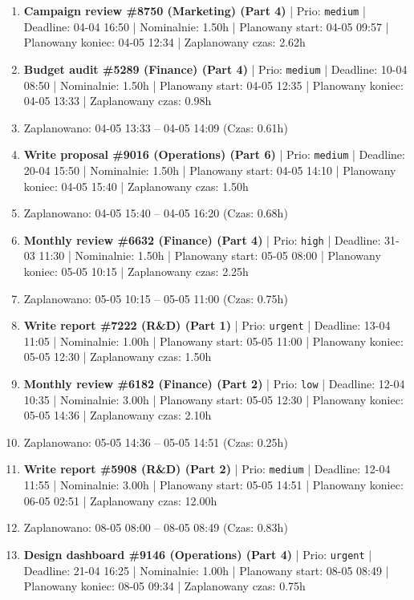 {\begin{enumerate}
  \item [\textbf{14632}] \textbf{Campaign review \#8750 (Marketing) (Part 4)} | Prio: \texttt{medium} | Deadline: 04-04 16:50 | Nominalnie: 1.50h | Planowany start: 04-05 09:57 | Planowany koniec: 04-05 12:34 | Zaplanowany czas: 2.62h
  \item [\textbf{14630}] \textbf{Budget audit \#5289 (Finance) (Part 4)} | Prio: \texttt{medium} | Deadline: 10-04 08:50 | Nominalnie: 1.50h | Planowany start: 04-05 12:35 | Planowany koniec: 04-05 13:33 | Zaplanowany czas: 0.98h
  \item [\textbf{PRZERWA}] Zaplanowano: 04-05 13:33 -- 04-05 14:09 (Czas: 0.61h)
  \item [\textbf{14662}] \textbf{Write proposal \#9016 (Operations) (Part 6)} | Prio: \texttt{medium} | Deadline: 20-04 15:50 | Nominalnie: 1.50h | Planowany start: 04-05 14:10 | Planowany koniec: 04-05 15:40 | Zaplanowany czas: 1.50h
  \item [\textbf{PRZERWA}] Zaplanowano: 04-05 15:40 -- 04-05 16:20 (Czas: 0.68h)
  \item [\textbf{14615}] \textbf{Monthly review \#6632 (Finance) (Part 4)} | Prio: \texttt{high} | Deadline: 31-03 11:30 | Nominalnie: 1.50h | Planowany start: 05-05 08:00 | Planowany koniec: 05-05 10:15 | Zaplanowany czas: 2.25h
  \item [\textbf{PRZERWA}] Zaplanowano: 05-05 10:15 -- 05-05 11:00 (Czas: 0.75h)
  \item [\textbf{14601}] \textbf{Write report \#7222 (R\&D) (Part 1)} | Prio: \texttt{urgent} | Deadline: 13-04 11:05 | Nominalnie: 1.00h | Planowany start: 05-05 11:00 | Planowany koniec: 05-05 12:30 | Zaplanowany czas: 1.50h
  \item [\textbf{14690}] \textbf{Monthly review \#6182 (Finance) (Part 2)} | Prio: \texttt{low} | Deadline: 12-04 10:35 | Nominalnie: 3.00h | Planowany start: 05-05 12:30 | Planowany koniec: 05-05 14:36 | Zaplanowany czas: 2.10h
  \item [\textbf{PRZERWA}] Zaplanowano: 05-05 14:36 -- 05-05 14:51 (Czas: 0.25h)
  \item [\textbf{14674}] \textbf{Write report \#5908 (R\&D) (Part 2)} | Prio: \texttt{medium} | Deadline: 12-04 11:55 | Nominalnie: 3.00h | Planowany start: 05-05 14:51 | Planowany koniec: 06-05 02:51 | Zaplanowany czas: 12.00h
  \item [\textbf{PRZERWA}] Zaplanowano: 08-05 08:00 -- 08-05 08:49 (Czas: 0.83h)
  \item [\textbf{14606}] \textbf{Design dashboard \#9146 (Operations) (Part 4)} | Prio: \texttt{urgent} | Deadline: 21-04 16:25 | Nominalnie: 1.00h | Planowany start: 08-05 08:49 | Planowany koniec: 08-05 09:34 | Zaplanowany czas: 0.75h

\end{enumerate}}
